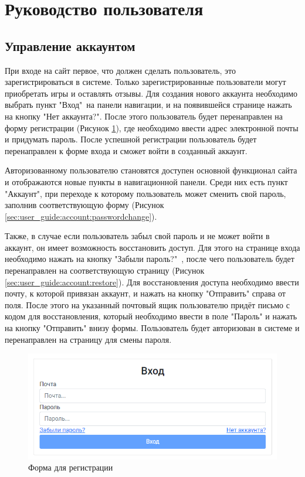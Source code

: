 \section{Руководство пользователя}
\label{sec:user_guide}

\subsection{Управление аккаунтом} 
\label{sec:user_guide:account}

При входе на сайт первое, что должен сделать пользователь, это зарегистрироваться в системе.
Только зарегистрированные пользователи могут приобретать игры и оставлять отзывы. Для создания нового аккаунта необходимо выбрать пункт
"Вход"\ на панели навигации, и на появившейся странице нажать на кнопку "Нет аккаунта?". После этого пользователь будет перенаправлен
на форму регистрации (Рисунок \ref*{sec:user_guide:account:register}), где необходимо ввести адрес электронной почты и придумать пароль.
После успешной регистрации пользователь будет перенаправлен к форме входа и сможет войти в созданный аккаунт.

Авторизованному пользователю становятся доступен основной функционал сайта и отображаются новые пункты в навигационной панели. Среди
них есть пункт "Аккаунт", при переходе к которому пользователь может сменить свой пароль, заполнив соответствующую форму (Рисунок \ref*{sec:user_guide:account:passwordchange}).

Также, в случае если пользователь забыл свой пароль и не может войти в аккаунт, он имеет возможность восстановить доступ. Для этого
на странице входа необходимо нажать на кнопку "Забыли пароль?"\ , после чего пользователь будет перенаправлен на соответствующую страницу
(Рисунок \ref*{sec:user_guide:account:restore}). Для восстановления доступа необходимо ввести почту, к которой привязан аккаунт, и 
нажать на кнопку "Отправить" справа от поля. После этого на указанный почтовый ящик пользователю придёт письмо с кодом для восстановления,
который необходимо ввести в поле "Пароль" и нажать на кнопку "Отправить" внизу формы. Пользователь будет авторизован в системе и перенаправлен
на страницу для смены пароля.

\begin{figure}[ht]
	\centering
	  \includegraphics[scale=0.8]{attachments/register.png}  
	  \caption{ Форма для регистрации }
	  \label{sec:user_guide:account:register}
\end{figure}

